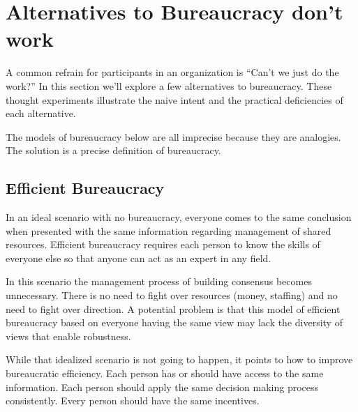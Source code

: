 \section{Alternatives to Bureaucracy don't work\label{sec:alternatives-to-bureaucracy}}
A common refrain for participants in an organization is ``Can't we just do the work?'' In this section we'll explore a few alternatives to bureaucracy. These thought experiments illustrate the naive intent and the practical deficiencies of each alternative.

The models of bureaucracy below are all imprecise because they are analogies. The solution is a precise definition of bureaucracy.



\subsection*{Efficient Bureaucracy}

In an ideal scenario with no bureaucracy, everyone comes to the same conclusion when presented with the same information regarding management of shared resources. Efficient bureaucracy requires each person to know the skills of everyone else so that anyone can act as an expert in any field. 

In this scenario the management process of building consensus becomes unnecessary. There is no need to fight over resources (money, staffing) and no need to fight over direction. A potential problem is that this model of efficient bureaucracy based on everyone having the same view may lack the diversity of views that enable robustness.


While that idealized scenario is not going to happen, it points to how to improve bureaucratic efficiency. Each person has or should have access to the same information. 
Each person should apply the same decision making process consistently.
Every person should have the same incentives.

